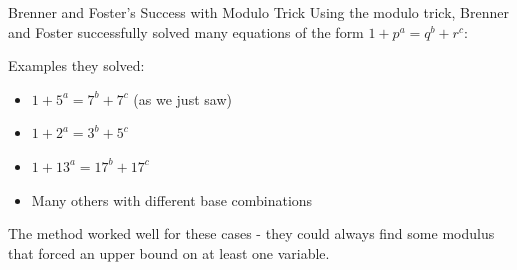 \begin{frame}{Brenner and Foster's Success with Modulo Trick}
    Using the modulo trick, Brenner and Foster successfully solved many equations of the form $1+p^a = q^b + r^c$:
    
    \vspace{0.3cm}
    Examples they solved:
    \begin{itemize}
        \item $1+5^a = 7^b + 7^c$ (as we just saw)
        \item $1+2^a = 3^b + 5^c$
        \item $1+13^a = 17^b + 17^c$
        \item Many others with different base combinations
    \end{itemize}
    
    \vspace{0.3cm}
    The method worked well for these cases - they could always find some modulus that forced an upper bound on at least one variable.
\end{frame}

